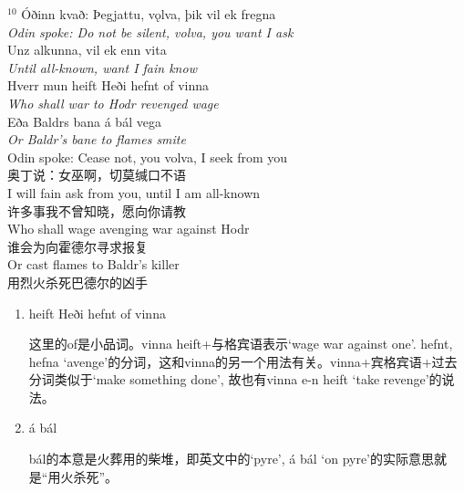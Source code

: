 \begin{paracol}{2}
    \noindent
    $^{10}$ Óðinn kvað: Þegjattu, vǫlva, þik vil ek fregna\\
    \textit{Odin spoke: Do not be silent, volva, you want I ask}\\
    Unz alkunna, vil ek enn vita\\
    \textit{Until all-known, want I fain know}\\
    Hverr mun heift Heði hefnt of vinna\\
    \textit{Who shall war to Hodr revenged wage}\\
    Eða Baldrs bana á bál vega\\
    \textit{Or Baldr's bane to flames smite}\\
    \switchcolumn
    \noindent
    Odin spoke: Cease not, you volva, I seek from you\\
    奥丁说：女巫啊，切莫缄口不语\\
    I will fain ask from you, until I am all-known\\
    许多事我不曾知晓，愿向你请教\\
    Who shall wage avenging war against Hodr\\
    谁会为向霍德尔寻求报复\\
    Or cast flames to Baldr's killer\\
    用烈火杀死巴德尔的凶手

\end{paracol}
\begin{grammar*}{}
    \begin{enumerate}[leftmargin=*]
        \item heift Heði hefnt of vinna

              这里的of是小品词。vinna heift+与格宾语表示`wage war against one'. hefnt, hefna `avenge'的分词，这和vinna的另一个用法有关。vinna+宾格宾语+过去分词类似于`make something done', 故也有vinna e-n heift `take revenge'的说法。
        \item á bál

              bál的本意是火葬用的柴堆，即英文中的`pyre', á bál `on pyre'的实际意思就是“用火杀死”。
    \end{enumerate}
\end{grammar*}

